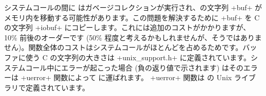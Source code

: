 システムコールの間に \ocaml はガベージコレクションが実行され、\ocaml の文字列 \ml+buf+ がメモリ内を移動する可能性があります。この問題を解決するために \ml+buf+ を C の文字列 \ml+iobuf+ にコピーします。これには追加のコストがかかりますが、10\% 前後のオーダーです (50\% 程度と考えるかもしれませんが、そうではありません)。関数全体のコストはシステムコールがほとんどを占めるためです。バッファに使う C の文字列の大きさは \ml+unix_support.h+ に定義されています。システムコール中にエラーが起こった場合 (負の返り値で示されます) はそのエラーは \ml+uerror+ 関数によって \ocaml に運ばれます。 \ml+uerror+ 関数は \ocaml の Unix ライブラリで定義されています。

